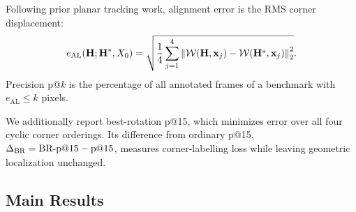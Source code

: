 \documentclass[10pt,twocolumn,letterpaper]{article}
\begin{document}
Following prior planar tracking work, alignment error is the RMS corner displacement:
\begin{equation}
    e_{\mathrm{AL}}(\mathbf{H};\mathbf{H}^{*},X_0)=
    \sqrt{\frac{1}{4}\sum_{j=1}^{4}
    \left\lVert\mathcal{W}(\mathbf{H},\mathbf{x}_j)-
    \mathcal{W}(\mathbf{H}^{*},\mathbf{x}_j)\right\rVert_2^2}.
\end{equation}
Precision p@$k$ is the percentage of all annotated frames of a benchmark with $e_{\mathrm{AL}}\leq k$ pixels.

We additionally report best-rotation p@15, which minimizes error over all four cyclic corner orderings.
Its difference from ordinary p@15, $\Delta_{\mathrm{BR}}=\text{BR-p@15}-\text{p@15}$, measures corner-labelling loss while leaving geometric localization unchanged.

\subsection{Main Results}
\label{sec:main-results}
\end{document}
